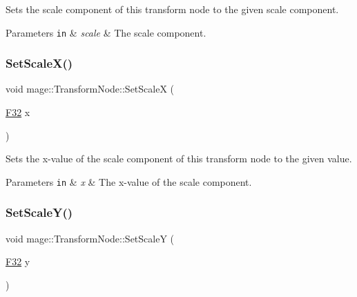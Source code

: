 Sets the scale component of this transform node to the given scale component.


\begin{DoxyParams}[1]{Parameters}
\mbox{\tt in}  & {\em scale} & The scale component. \\
\hline
\end{DoxyParams}
\hypertarget{structmage_1_1_transform_node_aba40e52810cbc4ef0db933ce771b1fac}{}\label{structmage_1_1_transform_node_aba40e52810cbc4ef0db933ce771b1fac} 
\subsubsection{\texorpdfstring{Set\+Scale\+X()}{SetScaleX()}}
{\footnotesize\ttfamily void mage\+::\+Transform\+Node\+::\+Set\+ScaleX (\begin{DoxyParamCaption}\item[{\hyperlink{namespacemage_aa97e833b45f06d60a0a9c4fc22ae02c0}{F32}}]{x }\end{DoxyParamCaption})\hspace{0.3cm}{\ttfamily [noexcept]}}

Sets the x-\/value of the scale component of this transform node to the given value.


\begin{DoxyParams}[1]{Parameters}
\mbox{\tt in}  & {\em x} & The x-\/value of the scale component. \\
\hline
\end{DoxyParams}
\hypertarget{structmage_1_1_transform_node_a8292656dfac20ee5e8b9c3e302b1fa6a}{}\label{structmage_1_1_transform_node_a8292656dfac20ee5e8b9c3e302b1fa6a} 
\subsubsection{\texorpdfstring{Set\+Scale\+Y()}{SetScaleY()}}
{\footnotesize\ttfamily void mage\+::\+Transform\+Node\+::\+Set\+ScaleY (\begin{DoxyParamCaption}\item[{\hyperlink{namespacemage_aa97e833b45f06d60a0a9c4fc22ae02c0}{F32}}]{y }\end{DoxyParamCaption})\hspace{0.3cm}{\ttfamily [noexcept]}}

